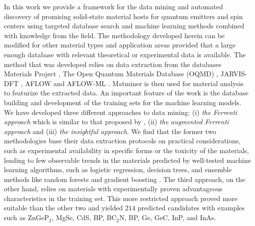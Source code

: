 \documentclass[superscriptaddress,unsortedaddress,
 amsmath,amssymb,
 aps,
]{revtex4-2}
\begin{document}
In this work we provide a framework for the data mining and automated discovery of promising solid-state material hosts for quantum emitters and spin centers using targeted database search and machine learning methods combined with knowledge from the field. The methodology developed herein can be modified for other material types and application areas provided that a large enough database with relevant theoretical or experimental data is available. 
The method that was developed relies on data extraction from the databases Materials Project \cite{Jain2013,Jain2018}, The Open Quantum Materials Database (OQMD) \cite{Saal2013, Kirklin2015}, JARVIS-DFT \cite{Choudhary2020}, AFLOW \cite{Curtarolo2012, Curtarolo2012a, Calderon2015} and AFLOW-ML \cite{Isayev2017}. 
Matminer \cite{Ward2018} is then used for material analysis to featurize the extracted data. 
An important feature of the work is the database building and development of the training sets for the machine learning models. We have developed three different approaches to data mining: (i) \emph{the Ferrenti approach} which is similar to that proposed by \citeauthor{Ferrenti2020}  \cite{Ferrenti2020}, (ii) \emph{the augmented Ferrenti approach} and (iii) \emph{the insightful approach}. We find that the former two methodologies base their data extraction protocols on practical considerations, such as experimental availability in specific forms or the toxicity of the materials, leading to few observable trends in the materials predicted by well-tested machine learning algorithms, such as logistic regression, decision trees, and ensemble methods like random forests and gradient boosting \cite{mehta2019,hastie2009}. The third approach, on the other hand, relies on materials with experimentally proven advantageous characteristics in the training set. This more restricted approach proved more suitable than the other two and yielded $214$ predicted candidates with examples such as ZnGeP$_2$, MgSe, CdS, BP, BC$_2$N, BP, Ge, GeC, InP, and InAs. 
\end{document}
